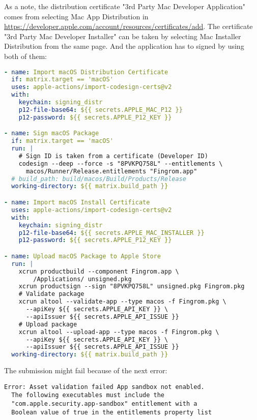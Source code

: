 \noindent As a note, the distribution certificate "3rd Party Mac Developer Application" comes from selecting Mac App 
Distribution in
\href{https://developer.apple.com/account/resources/certificates/add}{https://developer.apple.com/account/resources/certificates/add}.
The certificate "3rd Party Mac Developer Installer" can be taken by selecting Mac Installer Distribution from the same 
page. And the application has to signed by using both of them:

\begin{lstlisting}[language=yaml]
- name: Import macOS Distribution Certificate
  if: matrix.target == 'macOS'
  uses: apple-actions/import-codesign-certs@v2
  with: 
    keychain: signing_distr
    p12-file-base64: ${{ secrets.APPLE_MAC_P12 }}
    p12-password: ${{ secrets.APPLE_P12_KEY }}

- name: Sign macOS Package
  if: matrix.target == 'macOS'
  run: |
    # Sign ID is taken from a certificate (Developer ID)
    codesign --deep --force -s "8PVKPQ758L" --entitlements \
      macos/Runner/Release.entitlements "Fingrom.app"
  # build_path: build/macos/Build/Products/Release
  working-directory: ${{ matrix.build_path }}

- name: Import macOS Install Certificate
  uses: apple-actions/import-codesign-certs@v2
  with: 
    keychain: signing_distr
    p12-file-base64: ${{ secrets.APPLE_MAC_INSTALLER }}
    p12-password: ${{ secrets.APPLE_P12_KEY }}

- name: Upload macOS Package to Apple Store
  run: |
    xcrun productbuild --component Fingrom.app \
        /Applications/ unsigned.pkg
    xcrun productsign --sign "8PVKPQ758L" unsigned.pkg Fingrom.pkg
    # Validate package
    xcrun altool --validate-app --type macos -f Fingrom.pkg \
      --apiKey ${{ secrets.APPLE_API_KEY }} \
      --apiIssuer ${{ secrets.APPLE_API_ISSUE }}
    # Upload package
    xcrun altool --upload-app --type macos -f Fingrom.pkg \
      --apiKey ${{ secrets.APPLE_API_KEY }} \
      --apiIssuer ${{ secrets.APPLE_API_ISSUE }}
  working-directory: ${{ matrix.build_path }}
\end{lstlisting}


\noindent The submission might fail because of the next error:

\begin{lstlisting}[language=terminal]
Error: Asset validation failed App sandbox not enabled. 
  The following executables must include the 
  "com.apple.security.app-sandbox" entitlement with a 
  Boolean value of true in the entitlements property list
\end{lstlisting}


